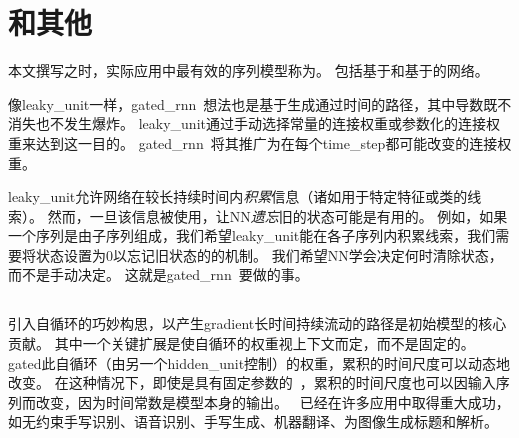 \section{和其他}
\label{sec:the_long_short_term_memory_and_other_gated_rnns}
本文撰写之时，实际应用中最有效的序列模型称为。
包括基于和基于的网络。

像\gls{leaky_unit}一样，\gls{gated_rnn}~想法也是基于生成通过时间的路径，其中导数既不消失也不发生爆炸。
\gls{leaky_unit}通过手动选择常量的连接权重或参数化的连接权重来达到这一目的。
\gls{gated_rnn}~将其推广为在每个\gls{time_step}都可能改变的连接权重。

\gls{leaky_unit}允许网络在较长持续时间内\emph{积累}信息（诸如用于特定特征或类的线索）。
然而，一旦该信息被使用，让\gls{NN}\emph{遗忘}旧的状态可能是有用的。
例如，如果一个序列是由子序列组成，我们希望\gls{leaky_unit}能在各子序列内积累线索，我们需要将状态设置为0以忘记旧状态的的机制。
我们希望\gls{NN}学会决定何时清除状态，而不是手动决定。
这就是\gls{gated_rnn}~要做的事。

\subsection{}
\label{sec:lstm}
引入自循环的巧妙构思，以产生\gls{gradient}长时间持续流动的路径是初始模型的核心贡献\citep{Hochreiter-Schmidhuber-1997}。
其中一个关键扩展是使自循环的权重视上下文而定，而不是固定的\citep{Gers-et-al-2000}。
\gls{gated}此自循环（由另一个\gls{hidden_unit}控制）的权重，累积的时间尺度可以动态地改变。
在这种情况下，即使是具有固定参数的~，累积的时间尺度也可以因输入序列而改变，因为时间常数是模型本身的输出。
~已经在许多应用中取得重大成功，如无约束手写识别\citep{Graves-et-al-2009}、语音识别\citep{Graves-et-al-2013,Graves-Jaitly-2014}、手写生成\citep{Graves-2013}、机器翻译\citep{Sutskever-et-al-2014}、为图像生成标题\citep{Kiros-et-al-2014b,Vinyals-et-al-2014b,Xu-et-al-2015}和解析\citep{Vinyals-et-al-2014a}。


